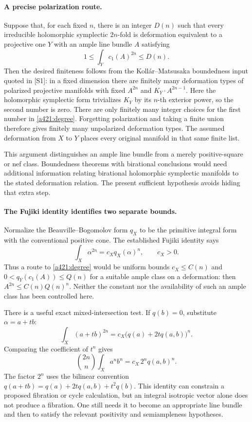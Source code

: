 \documentclass[11pt]{article}
\begin{document}
\paragraph{A precise polarization route.}
Suppose that, for each fixed $n$, there is an integer $D(n)$
such that every irreducible holomorphic symplectic
$2n$-fold is deformation equivalent to a projective one
$Y$ with an ample line bundle $A$ satisfying
\begin{equation}\label{a421:degree}
                       1\leq\int_Yc_1(A)^{2n}\leq D(n).
\end{equation}
Then the desired finiteness follows from the
Koll\'ar--Matsusaka boundedness input quoted in [S1]:
in a fixed dimension there are finitely many deformation
types of polarized projective manifolds with fixed
$A^{2n}$ and $K_Y\cdot A^{2n-1}$.
Here the holomorphic symplectic form trivializes $K_Y$
by its $n$-th exterior power, so the second number is zero.
There are only finitely many integer choices for
the first number in \eqref{a421:degree}.
Forgetting polarization and taking a finite union
therefore gives finitely many unpolarized
deformation types. The assumed deformation
from $X$ to $Y$ places every original manifold
in that same finite list.

This argument distinguishes an ample line bundle
from a merely positive-square or nef class.
Boundedness theorems with birational conclusions
would need additional information relating
birational holomorphic symplectic manifolds
to the stated deformation relation. The
present sufficient hypothesis avoids hiding
that extra step.

\paragraph{The Fujiki identity identifies two separate bounds.}
Normalize the Beauville--Bogomolov form $q_X$ to be the
primitive integral form with the conventional positive
cone. The established Fujiki identity says
\[
 \int_X\alpha^{2n}=c_Xq_X(\alpha)^n,\qquad c_X>0.
\]
Thus a route to \eqref{a421:degree} would be uniform
bounds $c_X\leq C(n)$ and $0<q_Y(c_1(A))\leq Q(n)$
for a suitable ample class on a deformation:
then $A^{2n}\leq C(n)Q(n)^n$.
Neither the constant nor the availability of such
an ample class has been controlled here.

There is a useful exact mixed-intersection test.
If $q(b)=0$, substitute $\alpha=a+tb$:
\[
 \int_X(a+tb)^{2n}
   =c_X\bigl(q(a)+2tq(a,b)\bigr)^n.
\]
Comparing the coefficient of $t^n$ gives
\begin{equation}\label{a421:mixed}
 \binom{2n}{n}\int_Xa^nb^n
                       =c_X\,2^nq(a,b)^n.
\end{equation}
The factor $2^n$ uses the bilinear convention
$q(a+tb)=q(a)+2tq(a,b)+t^2q(b)$.
This identity can constrain a proposed fibration
or cycle calculation, but an integral isotropic
vector alone does not produce a fibration.
One still needs it to become an appropriate
line bundle and then to satisfy the relevant
positivity and semiampleness hypotheses.
\end{document}

